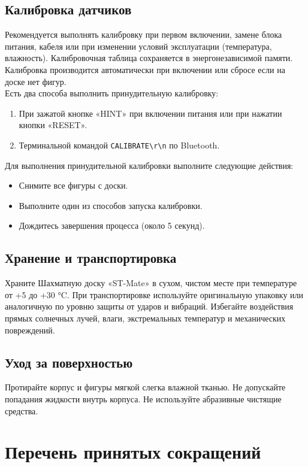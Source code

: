\documentclass[a4paper,12pt]{article}
\begin{document}
\subsection{Калибровка датчиков}
Рекомендуется выполнять калибровку при первом включении, замене блока питания, кабеля или при изменении условий эксплуатации (температура, влажность). 
Калибровочная таблица сохраняется в энергонезависимой памяти.
Калибровка производится автоматически при включении или сбросе если на доске нет фигур.\\
Есть два способа выполнить принудительную калибровку:

\begin{enumerate}
    \item При зажатой кнопке «HINT» при включении питания или при нажатии кнопки «RESET».
    \item Терминальной командой \texttt{CALIBRATE\textbackslash{r}\textbackslash{n}} по Bluetooth.
\end{enumerate}

Для выполнения принудительной калибровки выполните следующие действия:
\begin{itemize}
    \item Снимите все фигуры с доски.
    \item Выполните один из способов запуска калибровки.
    \item Дождитесь завершения процесса (около 5 секунд).
\end{itemize}

\subsection{Хранение и транспортировка}
Храните Шахматную доску «ST-Mate» в сухом, чистом месте при температуре от +5 до +30 °C.
При транспортировке используйте оригинальную упаковку или аналогичную по уровню защиты от ударов и вибраций. 
Избегайте воздействия прямых солнечных лучей, влаги, экстремальных температур и механических повреждений.

\subsection{Уход за поверхностью}
Протирайте корпус и фигуры мягкой слегка влажной тканью. Не допускайте попадания жидкости внутрь корпуса. Не используйте абразивные чистящие средства.


\newpage
\section{Перечень принятых сокращений}
\label{sec:abbreviations}
\end{document}
